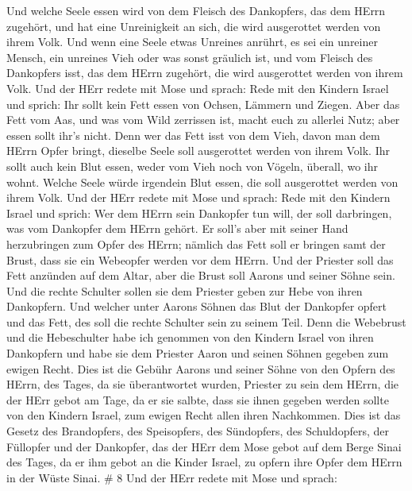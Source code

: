 Und welche Seele essen wird von dem Fleisch des Dankopfers, das dem
HErrn zugehört, und hat eine Unreinigkeit an sich, die wird ausgerottet
werden von ihrem Volk.  Und wenn eine Seele etwas Unreines
anrührt, es sei ein unreiner Mensch, ein unreines Vieh oder was sonst
gräulich ist, und vom Fleisch des Dankopfers isst, das dem HErrn
zugehört, die wird ausgerottet werden von ihrem Volk.  Und
der HErr redete mit Mose und sprach:  Rede mit den Kindern
Israel und sprich: Ihr sollt kein Fett essen von Ochsen, Lämmern und
Ziegen.  Aber das Fett vom Aas, und was vom Wild zerrissen
ist, macht euch zu allerlei Nutz; aber essen sollt ihr's nicht.
 Denn wer das Fett isst von dem Vieh, davon man dem HErrn
Opfer bringt, dieselbe Seele soll ausgerottet werden von ihrem Volk.
 Ihr sollt auch kein Blut essen, weder vom Vieh noch von
Vögeln, überall, wo ihr wohnt.  Welche Seele würde
irgendein Blut essen, die soll ausgerottet werden von ihrem Volk.
 Und der HErr redete mit Mose und sprach: 
Rede mit den Kindern Israel und sprich: Wer dem HErrn sein Dankopfer tun
will, der soll darbringen, was vom Dankopfer dem HErrn gehört.
 Er soll's aber mit seiner Hand herzubringen zum Opfer des
HErrn; nämlich das Fett soll er bringen samt der Brust, dass sie ein
Webeopfer werden vor dem HErrn.  Und der Priester soll das
Fett anzünden auf dem Altar, aber die Brust soll Aarons und seiner Söhne
sein.  Und die rechte Schulter sollen sie dem Priester
geben zur Hebe von ihren Dankopfern.  Und welcher unter
Aarons Söhnen das Blut der Dankopfer opfert und das Fett, des soll die
rechte Schulter sein zu seinem Teil.  Denn die Webebrust
und die Hebeschulter habe ich genommen von den Kindern Israel von ihren
Dankopfern und habe sie dem Priester Aaron und seinen Söhnen gegeben zum
ewigen Recht.  Dies ist die Gebühr Aarons und seiner Söhne
von den Opfern des HErrn, des Tages, da sie überantwortet wurden,
Priester zu sein dem HErrn,  die der HErr gebot am Tage, da
er sie salbte, dass sie ihnen gegeben werden sollte von den Kindern
Israel, zum ewigen Recht allen ihren Nachkommen.  Dies ist
das Gesetz des Brandopfers, des Speisopfers, des Sündopfers, des
Schuldopfers, der Füllopfer und der Dankopfer,  das der
HErr dem Mose gebot auf dem Berge Sinai des Tages, da er ihm gebot an
die Kinder Israel, zu opfern ihre Opfer dem HErrn in der Wüste Sinai. \#
8  Und der HErr redete mit Mose und sprach: 
